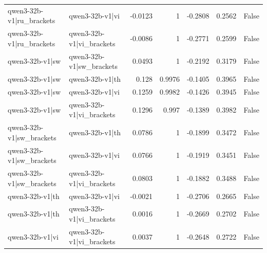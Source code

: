 \begin{table}
\begin{tabular}{l l r r r r l}
qwen3-32b-v1|ru_brackets & qwen3-32b-v1|vi & -0.0123 & 1 & -0.2808 & 0.2562 & False \\
qwen3-32b-v1|ru_brackets & qwen3-32b-v1|vi_brackets & -0.0086 & 1 & -0.2771 & 0.2599 & False \\
qwen3-32b-v1|sw & qwen3-32b-v1|sw_brackets & 0.0493 & 1 & -0.2192 & 0.3179 & False \\
qwen3-32b-v1|sw & qwen3-32b-v1|th & 0.128 & 0.9976 & -0.1405 & 0.3965 & False \\
qwen3-32b-v1|sw & qwen3-32b-v1|vi & 0.1259 & 0.9982 & -0.1426 & 0.3945 & False \\
qwen3-32b-v1|sw & qwen3-32b-v1|vi_brackets & 0.1296 & 0.997 & -0.1389 & 0.3982 & False \\
qwen3-32b-v1|sw_brackets & qwen3-32b-v1|th & 0.0786 & 1 & -0.1899 & 0.3472 & False \\
qwen3-32b-v1|sw_brackets & qwen3-32b-v1|vi & 0.0766 & 1 & -0.1919 & 0.3451 & False \\
qwen3-32b-v1|sw_brackets & qwen3-32b-v1|vi_brackets & 0.0803 & 1 & -0.1882 & 0.3488 & False \\
qwen3-32b-v1|th & qwen3-32b-v1|vi & -0.0021 & 1 & -0.2706 & 0.2665 & False \\
qwen3-32b-v1|th & qwen3-32b-v1|vi_brackets & 0.0016 & 1 & -0.2669 & 0.2702 & False \\
qwen3-32b-v1|vi & qwen3-32b-v1|vi_brackets & 0.0037 & 1 & -0.2648 & 0.2722 & False \\
\bottomrule
\end{tabular}
\end{table}
